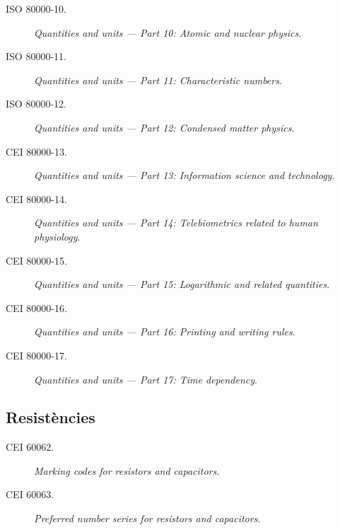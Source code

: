 \begin{description}
	\item [\hspace{5mm}ISO 80000-10.] \textit{Quantities and units --- Part 10: Atomic and nuclear physics}.
	\item [\hspace{5mm}ISO 80000-11.] \textit{Quantities and units --- Part 11: Characteristic numbers}.
	\item [\hspace{5mm}ISO 80000-12.] \textit{Quantities and units --- Part 12: Condensed matter physics}.
	\item [\hspace{5mm}CEI 80000-13.] \textit{Quantities and units --- Part 13: Information science and technology}.
	\item [\hspace{5mm}CEI 80000-14.] \textit{Quantities and units --- Part 14: Telebiometrics related to human physiology}.
	\item [\hspace{5mm}CEI 80000-15.] \textit{Quantities and units --- Part 15: Logarithmic and related quantities}.
	\item [\hspace{5mm}CEI 80000-16.] \textit{Quantities and units --- Part 16: Printing and writing rules}.
	\item [\hspace{5mm}CEI 80000-17.] \textit{Quantities and units --- Part 17: Time dependency}.    
\end{description}

\subsection*{Resistències} 
\begin{description}
	\item [\hspace{5mm}CEI 60062.] \textit{Marking codes for resistors and capacitors}.	
	\item [\hspace{5mm}CEI 60063.] \textit{Preferred number series for resistors and capacitors}.
\end{description}

